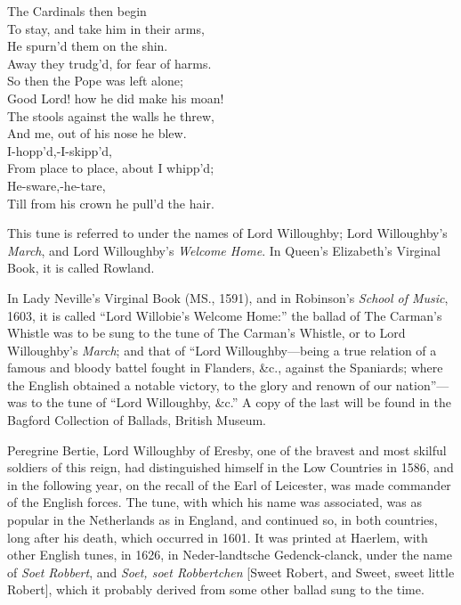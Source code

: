 \begin{dcverse}
\begin{patverse}
The Cardinals then begin\\
To stay, and take him in their arms,\\
He spurn’d them on the shin.\\
Away they trudg’d, for fear of harms.\\
So then the Pope was left alone;\\
Good Lord! how he did make his moan!\\
The stools against the walls he threw,\\
And me, out of his nose he blew.\\
I-hopp’d,-I-skipp’d,\\
From place to place, about I whipp’d;\\
He-sware,-he-tare,\\
Till from his crown he pull’d the hair.
\end{patverse}
\end{dcverse}


This tune is referred to under the names of Lord Willoughby; Lord Wil\-loughby’s
\textit{March}, and Lord Willoughby’s \textit{Welcome Home}. In Queen’s Elizabeth’s
Virginal Book, it is called Rowland.

In Lady Neville’s Virginal Book (MS., 1591), and in Robinson’s \textit{School of
Music}, 1603, it is called “Lord Willobie’s Welcome Home:” the ballad of The
Carman’s Whistle was to be sung to the tune of The Carman’s Whistle, or to
Lord Willoughby’s \textit{March}; and that of “Lord Willoughby—being a true relation
of a famous and bloody battel fought in Flanders, \&c., against the Spaniards;
where the English obtained a notable victory, to the glory and renown of our
nation”—was to the tune of “Lord Willoughby, \&c.” A copy of the last will
be found in the Bagford Collection of Ballads, British Museum.

Peregrine Bertie, Lord Willoughby of Eresby, one of the bravest and most
skilful soldiers of this reign, had distinguished himself in the Low Countries in
1586, and in the following year, on the recall of the Earl of Leicester, was
made commander of the English forces. The tune, with which his name was
associated, was as popular in the Netherlands as in England, and continued so, in
both countries, long after his death, which occurred in 1601. It was printed at
Haerlem, with other English tunes, in 1626, in Neder-landtsche Gedenck-clanck,
under the name of \textit{Soet Robbert}, and \textit{Soet, soet Robbertchen} [Sweet Robert, and
Sweet, sweet little Robert], which it probably derived from some other ballad
sung to the time.

